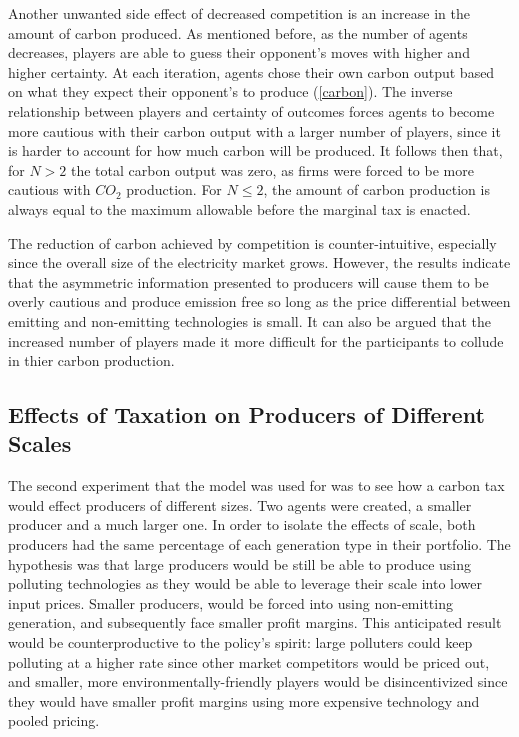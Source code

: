 \documentclass[12pt]{article}
\begin{document}
Another unwanted side effect of decreased competition is an increase in the amount of carbon produced. As mentioned before, as the number of agents decreases, players are able to guess their opponent's moves with higher and higher certainty. At each iteration, agents chose their own carbon output based on what they expect their opponent's to produce (\cref{carbon}). The inverse relationship between players and certainty of outcomes forces agents to become more cautious with their carbon output with a larger number of players, since it is harder to account for how much carbon will be produced. It follows then that, for $N>2$ the total carbon output was zero, as firms were forced to be more cautious with $CO_2$ production. For $N \leq 2$, the amount of carbon production is always equal to the maximum allowable before the marginal tax is enacted.\* 

The reduction of carbon achieved by competition is counter-intuitive, especially since the overall size of the electricity market grows. However, the results indicate that the asymmetric information presented to producers will cause them to be overly cautious and produce emission free so long as the price differential between emitting and non-emitting technologies is small. It can also be argued that the increased number of players made it more difficult for the participants to collude in thier carbon production.

\subsection{Effects of Taxation on Producers of Different Scales} \label{scale}

The second experiment that the model was used for was to see how a carbon tax would effect producers of different sizes. Two agents were created, a smaller producer and a much larger one. In order to isolate the effects of scale, both producers had the same percentage of each generation type in their portfolio. The hypothesis was that large producers would be still be able to produce using polluting technologies as they would be able to leverage their scale into lower input prices. Smaller producers, would be forced into using non-emitting generation, and subsequently face smaller profit margins. This anticipated result would be counterproductive to the policy's spirit: large polluters could keep polluting at a higher rate since other market competitors would be priced out, and smaller, more environmentally-friendly players would be disincentivized since they would have smaller profit margins using more expensive technology and pooled pricing. \*
\end{document}
